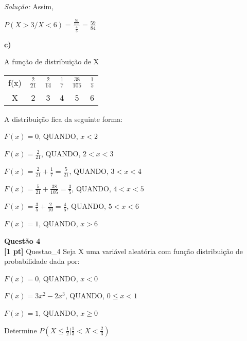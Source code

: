 \documentclass{article}
\newenvironment{problem}[2][Questão]
    { \begin{mdframed}[backgroundcolor=gray!20] \textbf{#1 #2} \\}
    {  \end{mdframed}}
\newenvironment{solution}
    {\textit{Solução:}}
    {}
\begin{document}
\begin{solution}
Assim,

\textbf{$P(X>3/X<6) = \frac{\frac{59}{105}}{\frac{4}{5}} = \frac{59}{84}$}

\hrulefill

\textbf{c) } 

A função de distribuição de X

\begin{center}
\begin{tabular}{ |c|c|c|c|c|c|}
\hline

f(x) & $\frac{2}{21}$ & $\frac{2}{14}$ & $\frac{1}{7}$ & $\frac{38}{105}$ & $\frac{1}{5}$ \\
X & 2 & 3 & 4 & 5 & 6 \\
 
 \hline
\end{tabular}
\end{center}


A distribuição fica da seguinte forma:

$F(x) = 0$, QUANDO, $x<2$

$F(x) = \frac{2}{21}$, QUANDO, $2<x<3$

$F(x) = \frac{2}{21} + \frac{1}{7} = \frac{5}{21}$, QUANDO, $3<x<4$

$F(x) = \frac{5}{21} + \frac{38}{105} = \frac{3}{5}$, QUANDO, $4<x<5$

$F(x) = \frac{3}{5} + \frac{2}{10} = \frac{4}{5}$, QUANDO, $5<x<6$

$F(x) = 1$, QUANDO, $x>6$


\end{solution}

\begin{problem}{4}
\textbf{[1 pt]} Questao\_4 Seja X uma variável aleatória com função distribuição de probabilidade dada por:

$F(x) = 0$, QUANDO, $x < 0$

$F(x) = 3x^{2} - 2x^{3}$, QUANDO, $ 0 \leq x < 1$

$F(x) = 1$, QUANDO, $x \geq 0$

Determine $P(X \leq \frac{1}{2} | \frac{1}{3} < X < \frac{2}{3})$

\end{problem}
\end{document}

